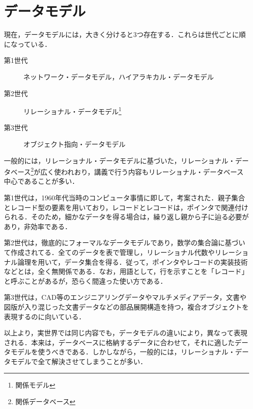 \documentclass[a4paper,10pt]{jreport}
\begin{document}
\section{データモデル}
\par 現在，データモデルには，大きく分けると3つ存在する．これらは世代ごとに順になっている．
\begin{description}
	\item[第1世代] ネットワーク・データモデル，ハイアラキカル・データモデル
	\item[第2世代] リレーショナル・データモデル\footnote{関係モデル}
	\item[第3世代] オブジェクト指向・データモデル
\end{description}
一般的には，リレーショナル・データモデルに基づいた，リレーショナル・データベース\footnote{関係データベース}が広く使われおり，講義で行う内容もリレーショナル・データベース中心であることが多い．
\par 第1世代は，1960年代当時のコンピュータ事情に即して，考案された．親子集合とレコード型の要素を用いており，レコードとレコードは，ポインタで関連付けられる．そのため，細かなデータを得る場合は，繰り返し親から子に辿る必要があり，非効率である．
\par 第2世代は，徹底的にフォーマルなデータモデルであり，数学の集合論に基づいて作成されてる．全てのデータを表で管理し，リレーショナル代数やリレーショナル論理を用いて，データ集合を得る．従って，ポインタやレコードの実装技術などとは，全く無関係である．なお，用語として，行を示すことを「レコード」と呼ぶことがあるが，恐らく間違った使い方である．
\par 第3世代は，CAD等のエンジニアリングデータやマルチメディアデータ，文書や図版が入り混じった文書データなどの部品展開構造を持つ，複合オブジェクトを表現するのに向いている．
\par 以上より，実世界では同じ内容でも，データモデルの違いにより，異なって表現される．本来は，データベースに格納するデータに合わせて，それに適したデータモデルを使うべきである．しかしながら，一般的には，リレーショナル・データモデルで全て解決させてしまうことが多い．
\end{document}
